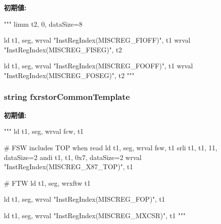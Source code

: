 \label{namespaceinsts_1_1simd128_1_1integer_1_1save__and__restore__state_1_1save__and__restore__state_ae9ab41da4f555469d0de6573b69b9c63}
{\bfseries 初期値:}
\begin{DoxyCode}
"""
    limm t2, 0, dataSize=8

    ld t1, seg, %
    wrval "InstRegIndex(MISCREG_FIOFF)", t1
    wrval "InstRegIndex(MISCREG_FISEG)", t2

    ld t1, seg, %
    wrval "InstRegIndex(MISCREG_FOOFF)", t1
    wrval "InstRegIndex(MISCREG_FOSEG)", t2
"""
\end{DoxyCode}
\hypertarget{namespaceinsts_1_1simd128_1_1integer_1_1save__and__restore__state_1_1save__and__restore__state_a254ce8e715d9d355be540328678c75cf}{
\subsubsection[{fxrstorCommonTemplate}]{\setlength{\rightskip}{0pt plus 5cm}string {\bf fxrstorCommonTemplate}}}
\label{namespaceinsts_1_1simd128_1_1integer_1_1save__and__restore__state_1_1save__and__restore__state_a254ce8e715d9d355be540328678c75cf}
{\bfseries 初期値:}
\begin{DoxyCode}
"""
    ld t1, seg, %
    wrval fcw, t1

    # FSW includes TOP when read
    ld t1, seg, %
    wrval fsw, t1
    srli t1, t1, 11, dataSize=2
    andi t1, t1, 0x7, dataSize=2
    wrval "InstRegIndex(MISCREG_X87_TOP)", t1

    # FTW
    ld t1, seg, %
    wrxftw t1

    ld t1, seg, %
    wrval "InstRegIndex(MISCREG_FOP)", t1

    ld t1, seg, %
    wrval "InstRegIndex(MISCREG_MXCSR)", t1
"""
\end{DoxyCode}
